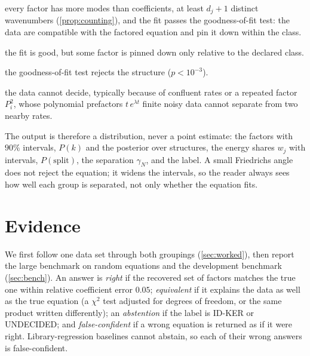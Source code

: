 \documentclass[11pt]{article}
\theoremstyle{plain}
\theoremstyle{definition}
\theoremstyle{remark}
\newcommand{\gN}{\gamma_{N}}                %
\newcommand{\lab}[1]{\textsf{#1}}           %
\newcommand{\FC}{\lab{FIT-COMPATIBLE}}
\newcommand{\IDK}{\lab{ID-KER}}
\newcommand{\MIS}{\lab{MISFIT}}
\newcommand{\UND}{\lab{UNDECIDED}}
\begin{document}
\begin{description}[leftmargin=7.6em,labelwidth=7.1em,labelsep=0.5em,itemsep=2pt,topsep=4pt,font=\normalfont]
\item[\FC] every factor has more modes than coefficients, at least $d_j+1$ distinct wavenumbers (\cref{prop:counting}), and
the fit passes the goodness-of-fit test: the data are compatible with the factored equation and pin it down within the class.
\item[\IDK] the fit is good, but some factor is pinned down only relative to the declared class.
\item[\MIS] the goodness-of-fit test rejects the structure ($p<10^{-3}$).
\item[\UND] the data cannot decide, typically because of confluent rates or a repeated factor $P_i^2$, whose polynomial
prefactors $t\,e^{\lambda t}$ finite noisy data cannot separate from two nearby rates.
\end{description}

\noindent The output is therefore a distribution, never a point estimate: the factors with $90\%$ intervals, $P(k)$ and
the posterior over structures, the energy shares $w_j$ with intervals, $P(\text{split})$, the separation $\gN$, and the
label. A small Friedrichs angle does not reject the equation; it widens the intervals, so the reader always sees how well
each group is separated, not only whether the equation fits.

\section{Evidence}\label{sec:evidence}
We first follow one data set through both groupings (\cref{sec:worked}), then report the large benchmark on random
equations and the development benchmark (\cref{sec:bench}). An answer is \emph{right} if the recovered set of factors
matches the true one within relative coefficient error $0.05$; \emph{equivalent} if it explains the data as well as the
true equation (a $\chi^2$ test adjusted for degrees of freedom, or the same product written differently); an
\emph{abstention} if the label is \IDK{} or \UND; and \emph{false-confident} if a wrong equation is returned as if it
were right. Library-regression baselines cannot abstain, so each of their wrong answers is false-confident.
\end{document}
